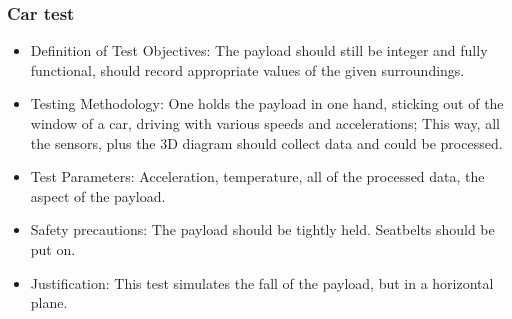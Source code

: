 \subsubsection{Car test}

\begin{itemize}
 \item Definition of Test Objectives: The payload should still be integer and fully functional, should record appropriate values of the given surroundings.
 \item Testing Methodology: One holds the payload in one hand, sticking out of the window of a car, driving with various speeds and accelerations; This way, all the sensors, plus the 3D diagram should collect data and could be processed.
 \item Test Parameters: Acceleration, temperature, all of the processed data, the aspect of the payload.
 \item Safety precautions: The payload should be tightly held. Seatbelts should be put on.
 \item Justification: This test simulates the fall of the payload, but in a horizontal plane.
\end{itemize}
